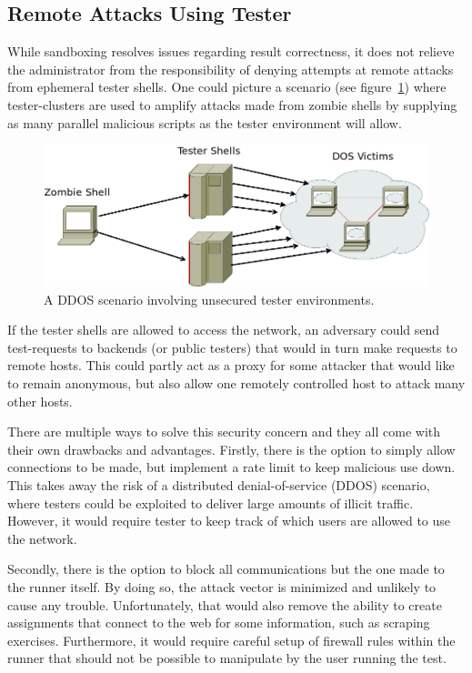 \subsection{Remote Attacks Using Tester}
While sandboxing resolves issues regarding result correctness, it does not relieve the administrator from the responsibility of denying attempts at remote attacks from ephemeral tester shells. One could picture a scenario (see figure~\ref{fig:tester-ddos}) where tester-clusters are used to amplify attacks made from zombie shells by supplying as many parallel malicious scripts as the tester environment will allow.
\begin{figure}[ht]
    \centering
    \includegraphics[width=\textwidth]{img/tester_amplification.png}
    \caption{A DDOS scenario involving unsecured tester environments.}\label{fig:tester-ddos}
\end{figure}
If the tester shells are allowed to access the network, an adversary could send test-requests to backends (or public testers) that would in turn make requests to remote hosts. This could partly act as a proxy for some attacker that would like to remain anonymous, but also allow one remotely controlled host to attack many other hosts.

There are multiple ways to solve this security concern and they all come with their own drawbacks and advantages. Firstly, there is the option to simply allow connections to be made, but implement a rate limit to keep malicious use down. This takes away the risk of a distributed denial-of-service (DDOS) scenario, where testers could be exploited to deliver large amounts of illicit traffic. However, it would require tester to keep track of which users are allowed to use the network.

Secondly, there is the option to block all communications but the one made to the runner itself. By doing so, the attack vector is minimized and unlikely to cause any trouble. Unfortunately, that would also remove the ability to create assignments that connect to the web for some information, such as scraping exercises. Furthermore, it would require careful setup of firewall rules within the runner that should not be possible to manipulate by the user running the test.

